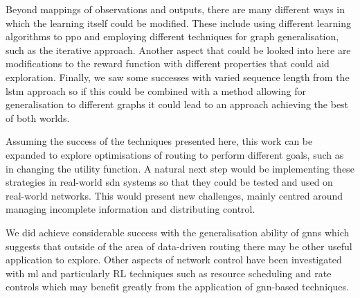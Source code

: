 Beyond mappings of observations and outputs, there are many different ways in which the learning itself could be modified. These include using different learning algorithms to \ac{ppo} and employing different techniques for graph generalisation, such as the iterative approach. Another aspect that could be looked into here are modifications to the reward function with different properties that could aid exploration. Finally, we saw some successes with varied sequence length from the \ac{lstm} approach so if this could be combined with a method allowing for generalisation to different graphs it could lead to an approach achieving the best of both worlds.

Assuming the success of the techniques presented here, this work can be expanded to explore optimisations of routing to perform different goals, such as in changing the utility function. A natural next step would be implementing these strategies in real-world \ac{sdn} systems so that they could be tested and used on real-world networks. This would present new challenges, mainly centred around managing incomplete information and distributing control.

We did achieve considerable success with the generalisation ability of \acp{gnn} which suggests that outside of the area of data-driven routing there may be other useful application to explore. Other aspects of network control have been investigated with \ac{ml} and particularly RL techniques such as resource scheduling and rate controls which may benefit greatly from the application of \ac{gnn}-based techniques.

